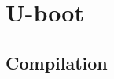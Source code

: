 \documentclass[resume]{subfiles}
\begin{document}
\section{U-boot}
\subsection{Compilation}
\end{document}
